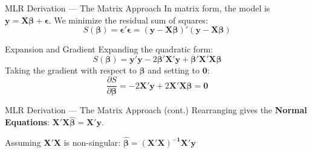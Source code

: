 \documentclass[12pt, aspectratio=169]{beamer}
\begin{document}
    \begin{frame}{MLR Derivation --- The Matrix Approach}
        In matrix form, the model is $\mathbf{y} = \mathbf{X}\boldsymbol{\beta} + \boldsymbol{\epsilon}$. We minimize the residual sum of squares:
        \begin{equation*}
            S(\boldsymbol{\beta}) = \boldsymbol{\epsilon}'\boldsymbol{\epsilon} = (\mathbf{y} - \mathbf{X}\boldsymbol{\beta})'(\mathbf{y} - \mathbf{X}\boldsymbol{\beta})
        \end{equation*}

        \begin{block}{Expansion and Gradient}
            Expanding the quadratic form:
            \begin{equation*}
                S(\boldsymbol{\beta}) = \mathbf{y}'\mathbf{y} - 2\boldsymbol{\beta}'\mathbf{X}'\mathbf{y} + \boldsymbol{\beta}'\mathbf{X}'\mathbf{X}\boldsymbol{\beta}
            \end{equation*}
            Taking the gradient with respect to $\boldsymbol{\beta}$ and setting to $\mathbf{0}$:
            \begin{equation*}
                \frac{\partial S}{\partial \boldsymbol{\beta}} = -2\mathbf{X}'\mathbf{y} + 2\mathbf{X}'\mathbf{X}\boldsymbol{\beta} = \mathbf{0}
            \end{equation*}
        \end{block}
    \end{frame}


    \begin{frame}{MLR Derivation --- The Matrix Approach (cont.)}
            Rearranging gives the \textbf{Normal Equations}: $\mathbf{X}'\mathbf{X}\hat{\boldsymbol{\beta}} = \mathbf{X}'\mathbf{y}$.

            \vspace{1em}

            Assuming $\mathbf{X}'\mathbf{X}$ is non-singular: \quad $\mathbf{\hat{\boldsymbol{\beta}} = (X'X)^{-1}X'y}$
    \end{frame}
\end{document}

